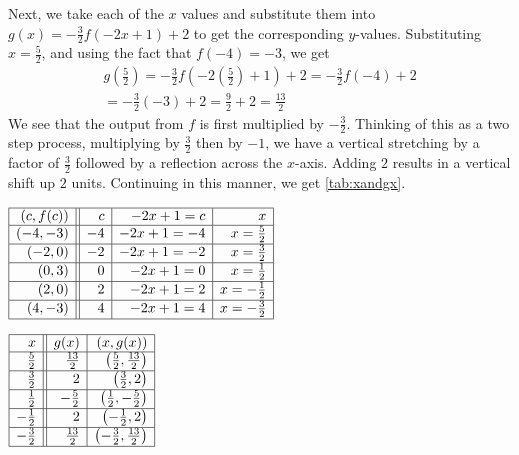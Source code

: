 \begin{ex}
Next, we take each of the $x$ values and substitute them into $g(x) = -\frac{3}{2}f(-2x+1) +2$ to get the corresponding $y$-values.  Substituting  $x=\frac{5}{2}$, and using the fact that $f(-4)=-3$, we get
 \begin{multline*}
  g\left(\frac{5}{2}\right) = -\frac{3}{2}f\left(-2\left(\frac{5}{2}\right) +1\right) +2 = -\frac{3}{2} f(-4) + 2 \\
  = -\frac{3}{2}(-3) + 2 = \frac{9}{2} + 2 = \frac{13}{2}
 \end{multline*}
We see that the output from $f$ is first multiplied by $-\frac{3}{2}$.  Thinking of this as a two step process, multiplying by $\frac{3}{2}$ then by $-1$, we have  a vertical stretching by a factor of $\frac{3}{2}$ followed by a reflection across the $x$-axis.  Adding $2$ results in a vertical shift up $2$ units.  Continuing in this manner, we get \autoref{tab:xandgx}.

\begin{table}
\begin{center}

$\begin{array}{|r||r|r|r|}  

\hline

(c,f(c))& c & -2x+1=c & x \\ \hline
(-4,-3) & -4 & -2x+1 = -4 & x = \frac{5}{2} \\ [1pt] \hline
(-2,0) &  -2 &  -2x+1 = -2 & x = \frac{3}{2} \\  [1pt] \hline
(0,3) & 0  & -2x+1 = 0 &  x = \frac{1}{2} \\ [1pt] \hline
(2,0)  & 2 & -2x+1 = 2  &  x = -\frac{1}{2} \\[1pt] \hline
(4,-3) & 4 & -2x+1 = 4  & x = -\frac{3}{2}  \\ [1pt] \hline

\end{array}$
\caption{}
\label{tab:candfc}
\end{center}
\end{table}

\begin{mtable}
$\begin{array}{|r||r|r|}  

\hline

 x & g(x) &  (x, g(x)) \\ \hline
\frac{5}{2}  & \frac{13}{2} &  \left(\frac{5}{2}, \frac{13}{2} \right) \\ [1pt] \hline
\frac{3}{2}  & 2 & \left(\frac{3}{2}, 2 \right)\\ [1pt] \hline
\frac{1}{2}  & - \frac{5}{2} & \left(\frac{1}{2}, -\frac{5}{2} \right)  \\ [1pt] \hline
-\frac{1}{2} & 2 &  \left(-\frac{1}{2}, 2 \right) \\ [1pt] \hline
-\frac{3}{2} & \frac{13}{2} &  \left(-\frac{3}{2}, \frac{13}{2} \right) \\ [1pt] \hline
\end{array}$
\caption{}
\label{tab:xandgx}
\end{mtable}


\end{ex}
